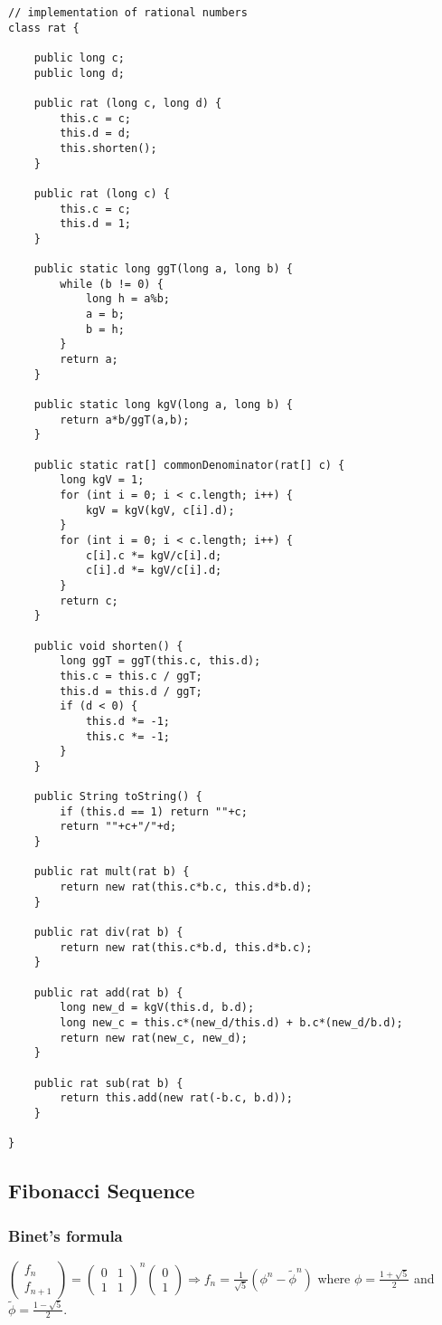\documentclass[9pt]{article}   	%
\begin{document}
\begin{lstlisting}
// implementation of rational numbers
class rat {

	public long c;
	public long d;
	
	public rat (long c, long d) {
		this.c = c;
		this.d = d;
		this.shorten();
	}
	
	public rat (long c) {
		this.c = c;
		this.d = 1;
	}
	
	public static long ggT(long a, long b) {
		while (b != 0) {
			long h = a%b;
			a = b;
			b = h;
		}
		return a;
	}
	
	public static long kgV(long a, long b) {
		return a*b/ggT(a,b);
	}
	
	public static rat[] commonDenominator(rat[] c) {
		long kgV = 1;
		for (int i = 0; i < c.length; i++) {
			kgV = kgV(kgV, c[i].d);
		}
		for (int i = 0; i < c.length; i++) {
			c[i].c *= kgV/c[i].d;
			c[i].d *= kgV/c[i].d;
		}
		return c;
	}
	
	public void shorten() {
		long ggT = ggT(this.c, this.d);
		this.c = this.c / ggT;
		this.d = this.d / ggT;
		if (d < 0) {
			this.d *= -1;
			this.c *= -1;
		}
	}
	
	public String toString() {
		if (this.d == 1) return ""+c;
		return ""+c+"/"+d;
	}
	
	public rat mult(rat b) {
		return new rat(this.c*b.c, this.d*b.d);
	}
	
	public rat div(rat b) {
		return new rat(this.c*b.d, this.d*b.c);
	}
	
	public rat add(rat b) {
		long new_d = kgV(this.d, b.d);
		long new_c = this.c*(new_d/this.d) + b.c*(new_d/b.d);
		return new rat(new_c, new_d);
	}
	
	public rat sub(rat b) {
		return this.add(new rat(-b.c, b.d));
	}
	
}
\end{lstlisting}

\subsection{Fibonacci Sequence}
\subsubsection{Binet's formula}
$
\begin{pmatrix}
f_n \\
f_{n+1}
\end{pmatrix} =
\begin{pmatrix}
0 & 1 \\
1 & 1
\end{pmatrix}^n
\begin{pmatrix}
0 \\
1
\end{pmatrix}
\Rightarrow
f_n = \frac{1}{\sqrt{5}} (\phi^n - \tilde{\phi}^n)$ where $\phi = \frac{1+\sqrt{5}}{2}$ and $\tilde{\phi} = \frac{1-\sqrt{5}}{2}$.
\end{document}
